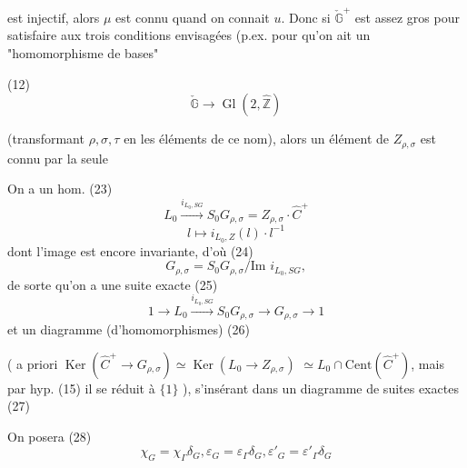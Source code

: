 \begin{enumerate}
est injectif, alors $\mu$ est connu quand on connait
$u$. Donc si $\check{\mathbb{G}}^+$ est assez gros pour satisfaire
aux trois conditions envisagées (p.ex. pour
qu'on ait un "homomorphisme de bases"

(12)
$$\check{\mathbb{G}} \longrightarrow \operatorname{Gl}(2, \hat{\mathbb{Z}})$$

(transformant $\rho, \sigma, \tau$ en les éléments de ce nom),
alors un élément de $Z_{\rho,\sigma}$ est connu par la seule

\newpage



\newpage



\newpage


On a un hom.
(23)
$$L_0 \xrightarrow{i_{L_0, SG}} S_0 G_{\rho,\sigma} = Z_{\rho,\sigma} \cdot \widehat{C}^+$$
$$l \longmapsto i_{L_0,Z}(l) \cdot l^{-1}$$
dont l'image est encore invariante, d'où
(24)
$$G_{\rho,\sigma} = S_0 G_{\rho,\sigma} / \text{Im } i_{L_0, SG} ,$$
de sorte qu'on a une suite exacte
(25)
$$1 \longrightarrow L_0 \xrightarrow{i_{L_0, SG}} S_0 G_{\rho,\sigma} \longrightarrow G_{\rho,\sigma} \longrightarrow 1$$
et un diagramme (d'homomorphismes)
(26)
( a priori $\operatorname{Ker}(\widehat{C}^+ \to G_{\rho,\sigma}) \simeq \operatorname{Ker}(L_0 \to Z_{\rho,\sigma})$
$\simeq L_0 \cap \text{Cent}(\widehat{C}^+)$, mais par hyp. (15)
il se réduit à $\{1\}$ ), s'insérant dans un
diagramme de suites exactes
(27)
On posera
(28)
$$\chi_G = \chi_\Gamma \delta_G , \varepsilon_G = \varepsilon_\Gamma \delta_G , \varepsilon'_G = \varepsilon'_\Gamma \delta_G$$


\end{enumerate}
